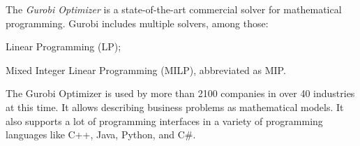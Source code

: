 \documentclass[../../thesis.tex]{subfiles}
\begin{document}
The \emph{Gurobi Optimizer} \cite{gurobi} is a state-of-the-art commercial solver for mathematical programming. 
Gurobi includes multiple solvers, among those:
\begin{enumerate*}[label=(\roman*)]
  \item Linear Programming (LP);
  \item Mixed Integer Linear Programming (MILP), abbreviated as MIP.
\end{enumerate*}


The Gurobi Optimizer is used by more than 2100 companies in over 40 industries at this time. It allows 
describing business problems as mathematical models. It also supports a lot of programming interfaces
in a variety of programming languages like C++, Java, Python, and C\#.
\end{document}
